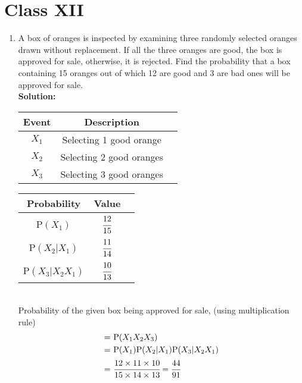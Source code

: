 \documentclass[journal,12pt,twocolumn]{IEEEtran}
\newcommand{\solution}{\noindent \textbf{Solution: }}
\newcommand\T{\rule{0pt}{2.6ex}}       %
\begin{document}
\section*{Class XII}

\begin{enumerate}[label=13.\arabic{enumi}.\arabic{enumii}]

\setcounter{enumi}{1}
\setcounter{enumii}{3}
\item A box of oranges is inspected by examining three randomly selected oranges drawn without replacement. If all the three oranges are good, the box is approved for sale, otherwise, it is rejected. Find the probability that a box containing 15 oranges out of which 12 are good and 3 are bad ones will be approved for sale.\\
	\solution
	\begin{table}[h!]
	\small
	\centering
		\begin{tabular}{|c|c|c|} \hline
			\textbf{Event}&\textbf{Description}\\ \hline
			$X_1$&Selecting 1 good orange  \\ \hline 
			$X_2$&Selecting 2 good oranges \\ \hline
			$X_3$&Selecting 3 good oranges \\ \hline
		\end{tabular}
	\end{table}
	\begin{table}[h!]
	\small
	\centering
		\begin{tabular}[20pt]{|c|c|c|} \hline
			\textbf{Probability}&\textbf{Value}\\ \hline
			P$(X_1)$ \T  &$\cfrac{12}{15}$  \\[1.5ex] \hline
			P$(X_2|X_1)$&$\cfrac{11}{14}$  \\[1.5ex] \hline
			P$(X_3|X_2X_1)$&$\cfrac{10}{13}$  \\[1.5ex] \hline
		\end{tabular}
	\end{table}\\
		Probability of the given box being approved for sale, (using multiplication rule)
	\begin{align}
		=& \text{ }\text{P}(X_1 X_2 X_3) \\
		=& \text{ }\text{P}(X_1)\text{P}(X_2|X_1)\text{P}(X_3|X_2X_1) \\
		=& \text{ }\cfrac{12 \times 11 \times 10}{15 \times 14 \times 13} = \cfrac{44}{91}
	\end{align}


\end{enumerate}
\end{document}

